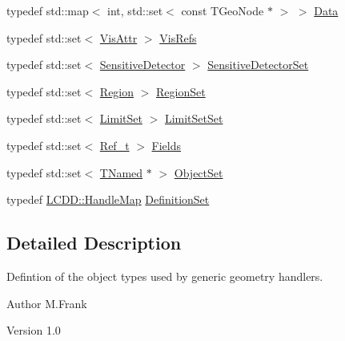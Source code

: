 \begin{DoxyCompactItemize}
\item 
typedef std::map$<$ int, std::set$<$ const TGeoNode $\ast$ $>$ $>$ \hyperlink{class_d_d4hep_1_1_geometry_1_1_geo_handler_types_a568935b7e878d3ea9fe97a2ecf33d641}{Data}
\item 
typedef std::set$<$ \hyperlink{class_d_d4hep_1_1_geometry_1_1_vis_attr}{VisAttr} $>$ \hyperlink{class_d_d4hep_1_1_geometry_1_1_geo_handler_types_abeb370eb52c06e48c61e6c8bc19b66ab}{VisRefs}
\item 
typedef std::set$<$ \hyperlink{class_d_d4hep_1_1_geometry_1_1_sensitive_detector}{SensitiveDetector} $>$ \hyperlink{class_d_d4hep_1_1_geometry_1_1_geo_handler_types_a16da960fef01a5643d04a029e524374f}{SensitiveDetectorSet}
\item 
typedef std::set$<$ \hyperlink{class_d_d4hep_1_1_geometry_1_1_region}{Region} $>$ \hyperlink{class_d_d4hep_1_1_geometry_1_1_geo_handler_types_a871413f297c033590fb56dcba5cc7dac}{RegionSet}
\item 
typedef std::set$<$ \hyperlink{class_d_d4hep_1_1_geometry_1_1_limit_set}{LimitSet} $>$ \hyperlink{class_d_d4hep_1_1_geometry_1_1_geo_handler_types_ae93bccfaccdbc36f0f5339c24aada447}{LimitSetSet}
\item 
typedef std::set$<$ \hyperlink{group___d_d4_h_e_p___g_e_o_m_e_t_r_y_ga40af83be6718bb8828a3d83dc7f8c930}{Ref\_\-t} $>$ \hyperlink{class_d_d4hep_1_1_geometry_1_1_geo_handler_types_ac82df292e19cfb74015cb798e54620b4}{Fields}
\item 
typedef std::set$<$ \hyperlink{class_t_named}{TNamed} $\ast$ $>$ \hyperlink{class_d_d4hep_1_1_geometry_1_1_geo_handler_types_a1e77c8aec4a291253804630c590af1d8}{ObjectSet}
\item 
typedef \hyperlink{class_d_d4hep_1_1_geometry_1_1_l_c_d_d_a05cb11e7355772c7b0794bcca59bf477}{LCDD::HandleMap} \hyperlink{class_d_d4hep_1_1_geometry_1_1_geo_handler_types_a960cd930e1a491fc9a6afa5058865b4e}{DefinitionSet}
\end{DoxyCompactItemize}


\subsection{Detailed Description}
Defintion of the object types used by generic geometry handlers. \begin{DoxyAuthor}{Author}
M.Frank 
\end{DoxyAuthor}
\begin{DoxyVersion}{Version}
1.0 
\end{DoxyVersion}


